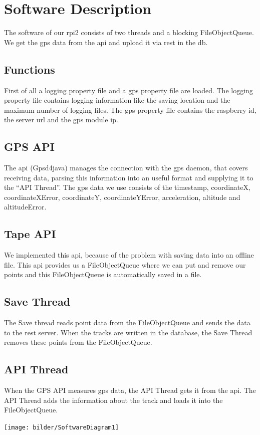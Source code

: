 \section{Software Description}
The software of our \gls{rpi2} consists of two threads and a blocking FileObjectQueue. We get the \gls{gps} data from the \gls{api} and upload it via \gls{rest} in the \gls{db}. 
\subsection{Functions}
First of all a logging property file and a gps property file are loaded. The logging property file contains logging information like the saving location and the maximum number of logging files. The gps property file contains the raspberry id, the server \gls{url} and the gps module \gls{ip}.
\subsection{GPS API}
The \gls{api} (Gpsd4java) manages the connection with the \gls{gps} daemon, that covers receiving data, parsing this information into an useful format and supplying it to the “API Thread”. The \gls{gps} data we use consists of the timestamp, coordinateX, coordinateXError, coordinateY, coordinateYError, acceleration, altitude and altitudeError.
\subsection{Tape API}
We implemented this \gls{api}, because of the problem with saving data into an offline file. This \gls{api} provides us a FileObjectQueue where we can put and remove our points and this FileObjectQueue is automatically saved in a file. 
\subsection{Save Thread}
The Save thread reads point data from the FileObjectQueue and sends the data to the \gls{rest} server. When the tracks are written in the database, the Save Thread removes these points from the FileObjectQueue.
\subsection{API Thread}
When the GPS API measures \gls{gps} data, the API Thread gets it from the \gls{api}. The API Thread adds the information about the track and loads it into the FileObjectQueue.
\begin{center}
\texttt{[image: bilder/SoftwareDiagram1]}
\end{center} 
